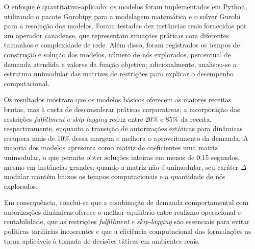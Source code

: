 O enfoque é quantitativo-aplicado: os modelos foram implementados em Python, utilizando o pacote Gurobipy para a modelagem matemática e o solver Gurobi para a resolução dos modelos. Foram testadas  dez instâncias reais fornecidas por um operador canadense, que representam situações práticas com diferentes tamanhos e complexidade de rede. Além disso, foram registrados os tempos de construção e solução dos modelos, número de nós explorados, percentual de demanda atendida e valores da função objetivo; adicionalmente, analisou-se a estrutura unimodular das matrizes de restrições para explicar o desempenho computacional.

Os resultados mostram que os modelos básicos oferecem as maiores receitas brutas, mas à custa de desconsiderar práticas corporativas; a incorporação das restrições \textit{fulfillment} e \textit{skip-lagging} reduz entre 20\% e 85\% da receita, respectivamente, enquanto a transição de autorizações estáticas para dinâmicas recupera mais de 10\% dessa margem e melhora o aproveitamento da demanda. A maioria dos modelos apresenta como matriz de coeficientes uma matriz unimodular, o que permite obter soluções inteiras em menos de 0,15 segundos, mesmo em instâncias grandes; quando a matriz não é unimodular, seu caráter $\Delta$-modular mantém baixos os tempos computacionais e a quantidade de nós explorados.

Em consequência, conclui-se que a combinação de demanda comportamental com autorizações dinâmicas oferece o melhor equilíbrio entre realismo operacional e rentabilidade, que as restrições \textit{fulfillment} e \textit{skip-lagging} são essenciais para evitar políticas tarifárias incoerentes e que a eficiência computacional das formulações as torna aplicáveis à tomada de decisões táticas em ambientes reais.










